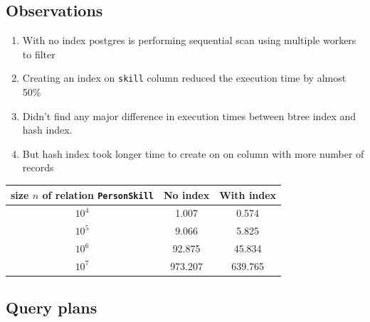 \documentclass{article}
\begin{document}
    \subsection*{Observations}
    \begin{enumerate}
      \item With no index postgres is performing sequential scan using multiple workers to filter
      \item Creating an index on {\tt skill} column reduced the execution time by almost 50\%
      \item Didn't find any major difference in execution times between btree index and hash index. 
      \item But hash index took longer time to create on on column with more number of records
    \end{enumerate}
    \begin{center}
    {\normalsize
      \begin{tabular}{c|c|c}
      size $n$ of relation {\tt PersonSkill} & No index & With index \\ \hline
      $10^4$ & 1.007 & 0.574 \\
      $10^5$ & 9.066 & 5.825 \\
      $10^6$ & 92.875 & 45.834 \\
      $10^7$ & 973.207& 639.765\\
      \end{tabular}
    }
    \end{center}

  
    \subsection*{Query plans}
\end{document}
